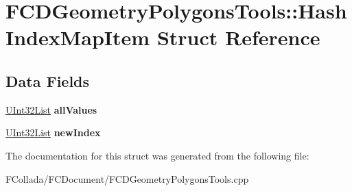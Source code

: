 \hypertarget{structFCDGeometryPolygonsTools_1_1HashIndexMapItem}{
\section{FCDGeometryPolygonsTools::HashIndexMapItem Struct Reference}
\label{structFCDGeometryPolygonsTools_1_1HashIndexMapItem}
}
\subsection*{Data Fields}
\begin{DoxyCompactItemize}
\item 
\hypertarget{structFCDGeometryPolygonsTools_1_1HashIndexMapItem_af22db3852e28e0136ce0d1f40b87e4d3}{
\hyperlink{classfm_1_1vector}{UInt32List} {\bfseries allValues}}
\label{structFCDGeometryPolygonsTools_1_1HashIndexMapItem_af22db3852e28e0136ce0d1f40b87e4d3}

\item 
\hypertarget{structFCDGeometryPolygonsTools_1_1HashIndexMapItem_a30732466b6713125c0e96372c1a826a1}{
\hyperlink{classfm_1_1vector}{UInt32List} {\bfseries newIndex}}
\label{structFCDGeometryPolygonsTools_1_1HashIndexMapItem_a30732466b6713125c0e96372c1a826a1}

\end{DoxyCompactItemize}


The documentation for this struct was generated from the following file:\begin{DoxyCompactItemize}
\item 
FCollada/FCDocument/FCDGeometryPolygonsTools.cpp\end{DoxyCompactItemize}
